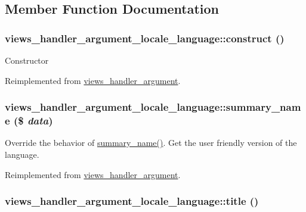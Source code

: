 \subsection{Member Function Documentation}
\hypertarget{classviews__handler__argument__locale__language_de5af4ea7ada57c6716a6712bbc767c5}{
\subsubsection[{construct}]{\setlength{\rightskip}{0pt plus 5cm}views\_\-handler\_\-argument\_\-locale\_\-language::construct ()}}
\label{classviews__handler__argument__locale__language_de5af4ea7ada57c6716a6712bbc767c5}


Constructor 

Reimplemented from \hyperlink{classviews__handler__argument_93594a31e95e1a14cead4f038d7b321b}{views\_\-handler\_\-argument}.\hypertarget{classviews__handler__argument__locale__language_1677e5e59d9e98999bf5781d7de21b39}{
\subsubsection[{summary\_\-name}]{\setlength{\rightskip}{0pt plus 5cm}views\_\-handler\_\-argument\_\-locale\_\-language::summary\_\-name (\$ {\em data})}}
\label{classviews__handler__argument__locale__language_1677e5e59d9e98999bf5781d7de21b39}


Override the behavior of \hyperlink{classviews__handler__argument__locale__language_1677e5e59d9e98999bf5781d7de21b39}{summary\_\-name()}. Get the user friendly version of the language. 

Reimplemented from \hyperlink{classviews__handler__argument_4c55a340453eed4d35c69f7ac790cac1}{views\_\-handler\_\-argument}.\hypertarget{classviews__handler__argument__locale__language_87bfadf6710bcc6bee4f734d258e7407}{
\subsubsection[{title}]{\setlength{\rightskip}{0pt plus 5cm}views\_\-handler\_\-argument\_\-locale\_\-language::title ()}}
\label{classviews__handler__argument__locale__language_87bfadf6710bcc6bee4f734d258e7407}


